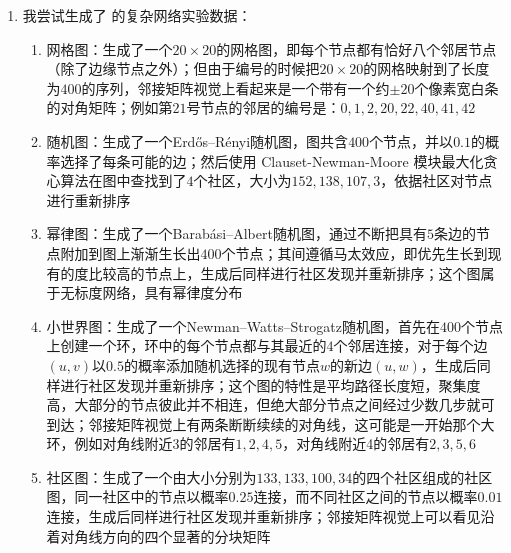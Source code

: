 \documentclass[11pt]{article}
\begin{document}
\begin{enumerate}
\item 我尝试生成了 \cite{zang2019neural} 的复杂网络实验数据：
\begin{enumerate}
\item 网格图：生成了一个$20\times20$的网格图，即每个节点都有恰好八个邻居节点（除了边缘节点之外）；但由于编号的时候把$20\times20$的网格映射到了长度为$400$的序列，邻接矩阵视觉上看起来是一个带有一个约$\pm 20$个像素宽白条的对角矩阵；例如第$21$号节点的邻居的编号是：$0,1,2,20,22,40,41,42$
\item 随机图：生成了一个Erdős–Rényi随机图，图共含$400$个节点，并以$0.1$的概率选择了每条可能的边；然后使用 Clauset-Newman-Moore 模块最大化贪心算法在图中查找到了$4$个社区，大小为$152,138,107,3$，依据社区对节点进行重新排序
\item 幂律图：生成了一个Barabási–Albert随机图，通过不断把具有$5$条边的节点附加到图上渐渐生长出$400$个节点；其间遵循马太效应，即优先生长到现有的度比较高的节点上，生成后同样进行社区发现并重新排序；这个图属于无标度网络，具有幂律度分布
\item 小世界图：生成了一个Newman–Watts–Strogatz随机图，首先在$400$个节点上创建一个环，环中的每个节点都与其最近的$4$个邻居连接，对于每个边$(u,v)$以$0.5$的概率添加随机选择的现有节点$w$的新边$(u,w)$，生成后同样进行社区发现并重新排序；这个图的特性是平均路径长度短，聚集度高，大部分的节点彼此并不相连，但绝大部分节点之间经过少数几步就可到达；邻接矩阵视觉上有两条断断续续的对角线，这可能是一开始那个大环，例如对角线附近3的邻居有$1,2,4,5$，对角线附近4的邻居有$2,3,5,6$
\item 社区图：生成了一个由大小分别为$133,133,100,34$的四个社区组成的社区图，同一社区中的节点以概率$0.25$连接，而不同社区之间的节点以概率$0.01$连接，生成后同样进行社区发现并重新排序；邻接矩阵视觉上可以看见沿着对角线方向的四个显著的分块矩阵
\end{enumerate}
\end{enumerate}

\renewcommand\refname{参考文献}


\end{document}

